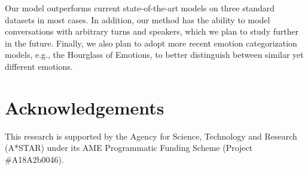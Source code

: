 \documentclass[journal]{IEEEtran}
\begin{document}
Our model outperforms current state-of-the-art models on three standard datasets in most cases. In addition, our method has the ability to model conversations with arbitrary turns and speakers, which we plan to study further in the future. Finally, we also plan to adopt more recent emotion categorization models, e.g., the Hourglass of Emotions, to better distinguish between similar yet different emotions.


\section*{Acknowledgements}
This research is supported by the Agency for Science, Technology and Research (A*STAR) under its AME Programmatic Funding Scheme (Project \#A18A2b0046).



\end{document}

